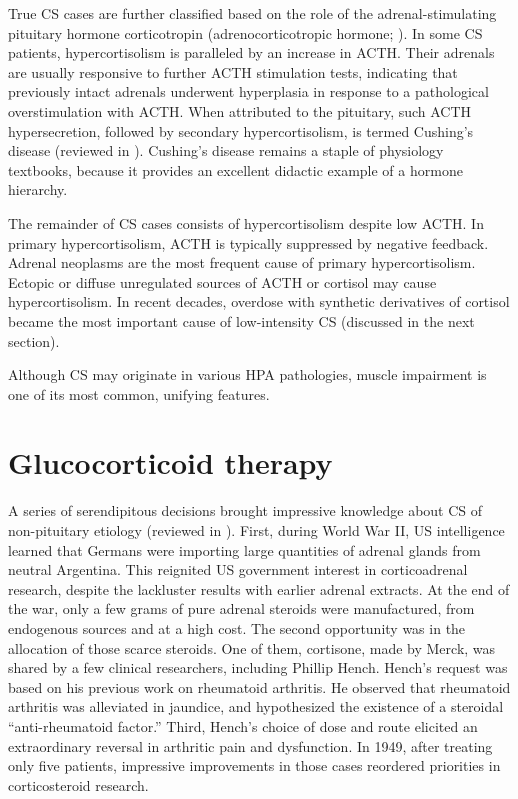 \documentclass[12pt,english]{report}\usepackage[]{graphicx}\usepackage[]{color}
\begin{document}
True CS cases are further classified based on the role of the adrenal-stimulating
pituitary hormone corticotropin (adrenocorticotropic hormone; ).
In some CS patients, hypercortisolism is paralleled by an increase
in ACTH. Their adrenals are usually responsive to further ACTH stimulation
tests, indicating that previously intact adrenals underwent hyperplasia
in response to a pathological overstimulation with ACTH. When attributed
to the pituitary, such ACTH hypersecretion, followed by secondary
hypercortisolism, is termed Cushing's disease (reviewed in \citep{kirk2000cushings}).
Cushing's disease remains a staple of physiology textbooks, because
it provides an excellent didactic example of a hormone hierarchy.

The remainder of CS cases consists of hypercortisolism despite low
ACTH. In primary hypercortisolism, ACTH is typically suppressed by
negative feedback. Adrenal neoplasms are the most frequent cause of
primary hypercortisolism. Ectopic or diffuse unregulated sources of
ACTH or cortisol may cause hypercortisolism. In recent decades, overdose
with synthetic derivatives of cortisol became the most important cause
of low-intensity CS (discussed in the next section).

Although CS may originate in various HPA pathologies, muscle impairment
is one of its most common, unifying features.


\section{Glucocorticoid therapy}

A series of serendipitous decisions brought impressive knowledge about
CS of non-pituitary etiology (reviewed in \citep{glyn1998discovery}).
First, during World War II, US intelligence learned that Germans were
importing large quantities of adrenal glands from neutral Argentina.
This reignited US government interest in corticoadrenal research,
despite the lackluster results with earlier adrenal extracts. At the
end of the war, only a few grams of pure adrenal steroids were manufactured,
from endogenous sources and at a high cost. The second opportunity
was in the allocation of those scarce steroids. One of them, cortisone,
made by Merck, was shared by a few clinical researchers, including
Phillip Hench. Hench's request was based on his previous work on rheumatoid
arthritis. He observed that rheumatoid arthritis was alleviated in
jaundice, and hypothesized the existence of a steroidal ``anti-rheumatoid
factor.'' Third, Hench's choice of dose and route elicited an extraordinary
reversal in arthritic pain and dysfunction. In 1949, after treating
only five patients\citep{hench1964reversibility}, impressive improvements
in those cases reordered priorities in corticosteroid research.
\end{document}
